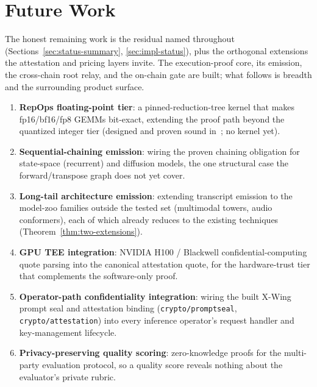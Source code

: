\section{Future Work}

The honest remaining work is the residual named throughout (Sections~\ref{sec:status-summary},
\ref{sec:impl-status}), plus the orthogonal extensions the attestation and pricing layers
invite. The execution-proof core, its emission, the cross-chain root relay, and the on-chain
gate are built; what follows is breadth and the surrounding product surface.

\begin{enumerate}
    \item \textbf{RepOps floating-point tier}: a pinned-reduction-tree kernel that makes
    fp16/bf16/fp8 GEMMs bit-exact, extending the proof path beyond the quantized integer
    tier (designed and proven sound in~\cite{poisoundness}; no kernel yet).
    \item \textbf{Sequential-chaining emission}: wiring the proven chaining obligation for
    state-space (recurrent) and diffusion models, the one structural case the
    forward/transpose graph does not yet cover.
    \item \textbf{Long-tail architecture emission}: extending transcript emission to the
    model-zoo families outside the tested set (multimodal towers, audio conformers), each of
    which already reduces to the existing techniques (Theorem~\ref{thm:two-extensions}).
    \item \textbf{GPU TEE integration}: NVIDIA H100 / Blackwell confidential-computing
    quote parsing into the canonical attestation quote, for the hardware-trust tier that
    complements the software-only proof.
    \item \textbf{Operator-path confidentiality integration}: wiring the built X-Wing prompt
    seal and attestation binding (\texttt{crypto/promptseal}, \texttt{crypto/attestation})
    into every inference operator's request handler and key-management lifecycle.
    \item \textbf{Privacy-preserving quality scoring}: zero-knowledge proofs for the
    multi-party evaluation protocol, so a quality score reveals nothing about the evaluator's
    private rubric.
\end{enumerate}
